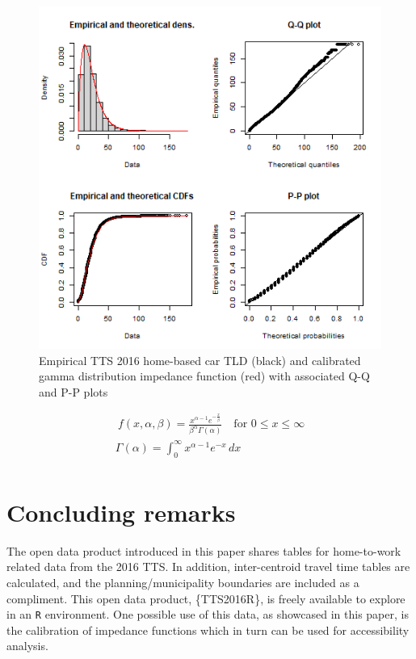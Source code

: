 \documentclass[Royal,times,sageh]{sagej}
\begin{document}
\begin{figure}

{\centering \includegraphics[width=0.75\linewidth]{images/impedance_function} 

}

\caption{\label{fig:TLD-Gamma-plot}Empirical TTS 2016 home-based car TLD (black) and calibrated gamma distribution impedance function (red) with associated Q-Q and P-P plots}\label{fig:TLD-Gamma-plot}
\end{figure}

\begin{equation}
\label{gamma-dist}
\begin{array}{l}\ 
f(x, \alpha, \beta) = \frac {x^{\alpha-1}e^{-\frac{x}{\beta}}}{ \beta^{\alpha}\Gamma(\alpha)} \quad \text{for } 0 \leq x \leq \infty\\
\Gamma(\alpha) =  \int_{0}^{\infty} x^{\alpha-1}e^{-x} \,dx\\
\end{array}
\end{equation}

\newpage

\hypertarget{concluding-remarks}{%
\section{Concluding remarks}\label{concluding-remarks}}

The open data product introduced in this paper shares tables for
home-to-work related data from the 2016 TTS. In addition, inter-centroid
travel time tables are calculated, and the planning/municipality
boundaries are included as a compliment. This open data product,
\{TTS2016R\}, is freely available to explore in an \texttt{R}
environment. One possible use of this data, as showcased in this paper,
is the calibration of impedance functions which in turn can be used for
accessibility analysis.
\end{document}
